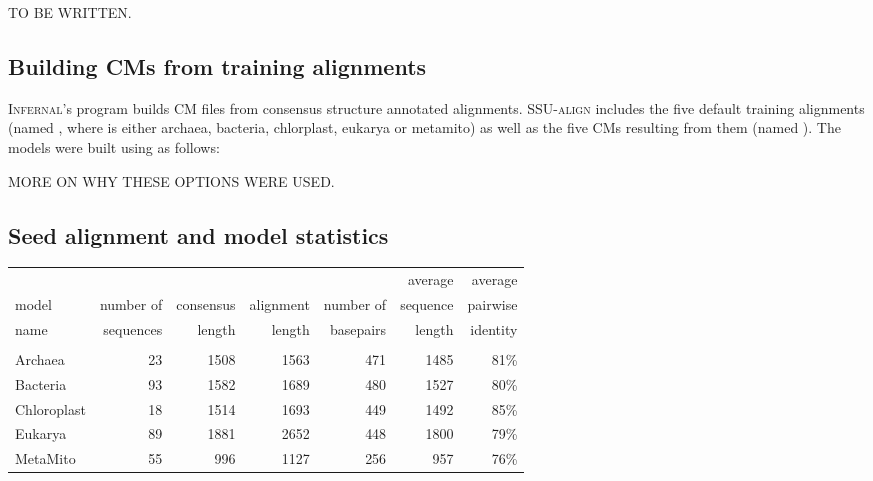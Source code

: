TO BE WRITTEN.

\subsection{Building CMs from training alignments}

\textsc{Infernal}'s  program builds CM files from
consensus structure annotated alignments. \textsc{SSU-align} includes
the five default training alignments (named , where
 is either archaea, bacteria, chlorplast, eukarya or
metamito) as well as the five CMs resulting from them (named
). The models were built using  as
follows: 

MORE ON WHY THESE OPTIONS WERE USED.

\subsection{Seed alignment and model statistics} 

\begin{tabular}{lrrrrrr}
        &           &           &           &           & average   & average  \\
model   & number of & consensus & alignment & number of & sequence  & pairwise \\
name    & sequences & length    & length    & basepairs & length    & identity \\ \hline
        &           &           &           &                       &          \\
Archaea & 23        & 1508      & 1563      & 471       & 1485      & 81\%     \\
Bacteria& 93        & 1582      & 1689      & 480       & 1527      & 80\%     \\
Chloroplast& 18     & 1514      & 1693      & 449       & 1492      & 85\%     \\
Eukarya  & 89       & 1881      & 2652      & 448       & 1800      & 79\%     \\ 
MetaMito & 55       &  996      & 1127      & 256       & 957       & 76\%     \\
\end{tabular}

